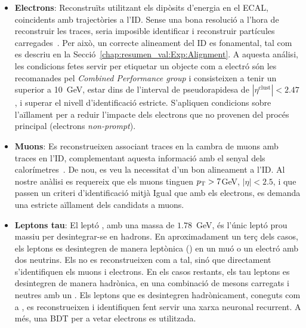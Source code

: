 \begin{itemize}
\item \textbf{Electrons}: 	Reconstruïts utilitzant els dipòsits d'energia en el ECAL, coincidents amb trajectòries a l'ID.
					Sense una bona resolució a l'hora de reconstruir les traces, seria imposible 
					identificar i reconstruir partícules carregades~\cite{ATLAS:2019qmc}. 
					Per això, un correcte alineament del
					ID es fonamental, tal com es descriu en la Secció~\ref{chap:resumen_val:Exp:Alignment}.
					A aquesta análisi, les condicions fetes servir per etiquetar un objecte com a electró són les
					recomanades pel \textit{Combined Performance group} i consisteixen a tenir un \pT superior
					a 10~GeV, estar dins de l'interval de pseudorapidesa de $|\eta^\mathrm{clust}| < 2.47$, i 
					superar el nivell d'identificació estricte. S'apliquen condicions sobre l'aïllament per a reduir
					l'impacte dels electrons que no provenen del procés principal (electrons \textit{non-prompt}).  
				
\item \textbf{Muons}:		Es reconstrueixen associant traces en la cambra de muons amb traces en l'ID,
					complementant aquesta informació amb el senyal dels calorímetres~\cite{ATLAS:2016lqx}.
					De nou, es veu la necessitat d'un bon alineament a l'ID. 
					Al nostre anàlisi es requereix que els muons tinguen $p_{\text{T}} > 7$GeV, $|\eta| < 2.5$,
					i que passen un criteri d'identificació mitjà %
					Igual que amb els electrons, es demanda una estricte aïllament dels candidats a muons.
					

\item \textbf{Leptons tau}:	El leptó \Ptau, amb una massa de $1.78$~GeV, és l'únic leptó 
					prou massiu per desintegrar-se en hadrons. En aproximadament un 
					terç dels casos, els leptons \Ptau es desintegren de manera leptònica (\taulep) en 
					un muó o un electró amb dos neutrins. Els \taulep no es reconstrueixen com a tal,
					sinó que directament s'identifiquen els muons i electrons. En 
					els casos restants, els tau leptons es desintegren de manera hadrònica, 
					en una combinació de mesons carregats i neutres amb un \Pnut. 
					Els leptons \Ptau que es desintegren hadrònicament, coneguts com 
					a \tauhad, es reconstrueixen i identifiquen fent servir una xarxa neuronal recurrent.
					A més, una BDT per a vetar electrons es utilitzada.
					

\end{itemize}
